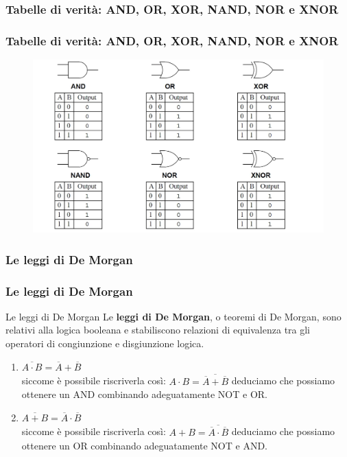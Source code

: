 \subsubsection[Tabelle di verità: AND, OR, XOR, NAND, NOR e XNOR]{Tabelle di verità: AND, OR, XOR, NAND, NOR e XNOR}
\begin{frame}
	\frametitle{Tabelle di verità: AND, OR, XOR, NAND, NOR e XNOR}

	\begin{figure}[!htbp]
		\centering 
		\includegraphics[width=1.0\linewidth]{images/2_elettronica/logic_gates_truthtables.png}
	\end{figure}
	
\end{frame}


\subsubsection[Le leggi di De Morgan]{Le leggi di De Morgan}
\begin{frame}
	\frametitle{Le leggi di De Morgan}

	\begin{block}{Le leggi di De Morgan}
		Le \textbf{leggi di De Morgan}, o teoremi di De Morgan, sono relativi alla logica booleana e stabiliscono relazioni di equivalenza tra gli operatori di congiunzione e disgiunzione logica.\\ \vspace{0.8em}
		
		\begin{enumerate}
			\item $\overline{A \cdot B} = \overline A + \overline B$\\
			siccome è possibile riscriverla così: $A \cdot B = \overline{\overline A + \overline B}$ deduciamo che possiamo ottenere un AND combinando adeguatamente NOT e OR.
			\item $\overline{A + B} = \overline {A} \cdot \overline {B}$	\\
			siccome è possibile riscriverla così: $A + B = \overline{\overline {A} \cdot \overline {B}}$
			deduciamo che possiamo ottenere un OR combinando adeguatamente NOT e AND.
		\end{enumerate}
		
	\end{block}
	
\end{frame}


